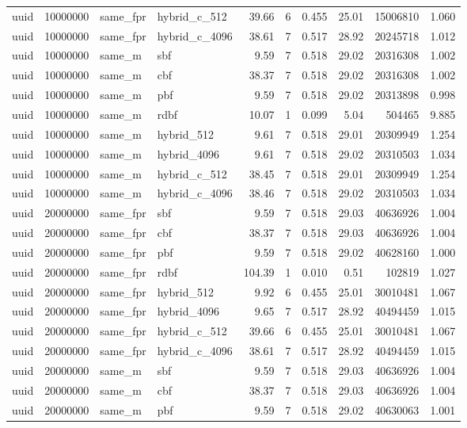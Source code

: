 \begin{tabular}{llllrrrrrr}
uuid & 10000000 & same\_fpr & hybrid\_c\_512 & 39.66 & 6 & 0.455 & 25.01 & 15006810 & 1.060 \\
uuid & 10000000 & same\_fpr & hybrid\_c\_4096 & 38.61 & 7 & 0.517 & 28.92 & 20245718 & 1.012 \\
uuid & 10000000 & same\_m & sbf & 9.59 & 7 & 0.518 & 29.02 & 20316308 & 1.002 \\
uuid & 10000000 & same\_m & cbf & 38.37 & 7 & 0.518 & 29.02 & 20316308 & 1.002 \\
uuid & 10000000 & same\_m & pbf & 9.59 & 7 & 0.518 & 29.02 & 20313898 & 0.998 \\
uuid & 10000000 & same\_m & rdbf & 10.07 & 1 & 0.099 & 5.04 & 504465 & 9.885 \\
uuid & 10000000 & same\_m & hybrid\_512 & 9.61 & 7 & 0.518 & 29.01 & 20309949 & 1.254 \\
uuid & 10000000 & same\_m & hybrid\_4096 & 9.61 & 7 & 0.518 & 29.02 & 20310503 & 1.034 \\
uuid & 10000000 & same\_m & hybrid\_c\_512 & 38.45 & 7 & 0.518 & 29.01 & 20309949 & 1.254 \\
uuid & 10000000 & same\_m & hybrid\_c\_4096 & 38.46 & 7 & 0.518 & 29.02 & 20310503 & 1.034 \\
uuid & 20000000 & same\_fpr & sbf & 9.59 & 7 & 0.518 & 29.03 & 40636926 & 1.004 \\
uuid & 20000000 & same\_fpr & cbf & 38.37 & 7 & 0.518 & 29.03 & 40636926 & 1.004 \\
uuid & 20000000 & same\_fpr & pbf & 9.59 & 7 & 0.518 & 29.02 & 40628160 & 1.000 \\
uuid & 20000000 & same\_fpr & rdbf & 104.39 & 1 & 0.010 & 0.51 & 102819 & 1.027 \\
uuid & 20000000 & same\_fpr & hybrid\_512 & 9.92 & 6 & 0.455 & 25.01 & 30010481 & 1.067 \\
uuid & 20000000 & same\_fpr & hybrid\_4096 & 9.65 & 7 & 0.517 & 28.92 & 40494459 & 1.015 \\
uuid & 20000000 & same\_fpr & hybrid\_c\_512 & 39.66 & 6 & 0.455 & 25.01 & 30010481 & 1.067 \\
uuid & 20000000 & same\_fpr & hybrid\_c\_4096 & 38.61 & 7 & 0.517 & 28.92 & 40494459 & 1.015 \\
uuid & 20000000 & same\_m & sbf & 9.59 & 7 & 0.518 & 29.03 & 40636926 & 1.004 \\
uuid & 20000000 & same\_m & cbf & 38.37 & 7 & 0.518 & 29.03 & 40636926 & 1.004 \\
uuid & 20000000 & same\_m & pbf & 9.59 & 7 & 0.518 & 29.02 & 40630063 & 1.001 \\

\end{tabular}
